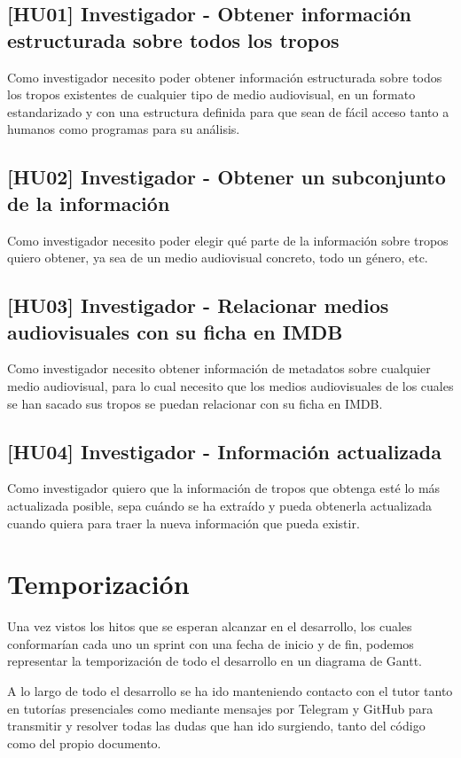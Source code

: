 \subsection{[HU01] Investigador - Obtener información estructurada sobre todos los tropos}
Como investigador necesito poder obtener información estructurada sobre todos los tropos existentes de cualquier tipo de medio audiovisual, en un formato estandarizado y con una estructura definida para que sean de fácil acceso tanto a humanos como programas para su análisis.

\subsection{[HU02] Investigador - Obtener un subconjunto de la información}
Como investigador necesito poder elegir qué parte de la información sobre tropos quiero obtener, ya sea de un medio audiovisual concreto, todo un género, etc.

\subsection{[HU03] Investigador - Relacionar medios audiovisuales con su ficha en IMDB}
Como investigador necesito obtener información de metadatos sobre cualquier medio audiovisual, para lo cual necesito que los medios audiovisuales de los cuales se han sacado sus tropos se puedan relacionar con su ficha en IMDB.

\subsection{[HU04] Investigador - Información actualizada}
Como investigador quiero que la información de tropos que obtenga esté lo más actualizada posible, sepa cuándo se ha extraído y pueda obtenerla actualizada cuando quiera para traer la nueva información que pueda existir.

\section{Temporización}
Una vez vistos los hitos que se esperan alcanzar en el desarrollo, los cuales conformarían cada uno un sprint con una fecha de inicio y de fin, podemos representar la temporización de todo el desarrollo en un diagrama de Gantt.

A lo largo de todo el desarrollo se ha ido manteniendo contacto con el tutor tanto en tutorías presenciales como mediante mensajes por Telegram y GitHub para transmitir y resolver todas las dudas que han ido surgiendo, tanto del código como del propio documento.